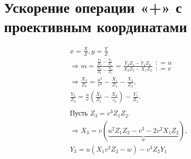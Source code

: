 \documentclass[12pt]{article}
\theoremstyle{definition}
\theoremstyle{definition}
\theoremstyle{definition}
\begin{document}
\section{Ускорение операции «+» с проективным координатами}
\begin{gather*}
    x = \frac{X}{Z}, y = \frac{Y}{Z}\\
    \Rightarrow m = \frac{\frac{Y_2}{Z_2} - \frac{Y_1}{Z_1}}{\frac{X_2}{Z_2} - \frac{X_1}{Z_1}} = \frac{Y_2 Z_1 - Y_1 Z_2}{X_2 Z_1 - X_1 Z_2}
    \begin{array}{*{20}{c}}
    {: = u} \\ 
    {: = v} 
    \end{array} \\
    \Rightarrow \frac{X_3}{Z_3} = \frac{u^2}{v^2} - \frac{X_1}{Z_1} - \frac{X_2}{Z_2}, \\
    \frac{Y_3}{Z_3} = \frac{u}{v}\left(\frac{X_1}{Z_1} - \frac{X_3}{z_3}\right) - \frac{Y_1}{Z_1}.\\\\
    \text{Пусть } Z_3 = v^3 Z_1 Z_2. \\
    \Rightarrow {X_3} = v(\underbrace{u^2 Z_1 Z_2 - v^3 - 2 v^2 X_1 Z_2}_w), \\
    Y_3 = u(X_1 v^2 Z_2 - w) - v^3 Z_2 Y_1
\end{gather*}
\end{document}
